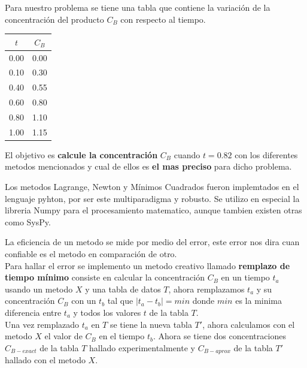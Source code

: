 \documentclass[10pt,a4paper]{article}
\begin{document}
\begin{multicols}{2}
		\noindent Para nuestro problema se tiene una tabla que contiene la variación de la concentración del producto $C_B$ con respecto al tiempo.
		
		\begin{center}
			\begin{tabular}{ |c|c| }
				\hline
				$t$ & $C_B$ \\ \hline
				0.00 & 0.00 \\ \hline
				0.10 & 0.30 \\ \hline
				0.40 & 0.55 \\ \hline
				0.60 & 0.80 \\ \hline
				0.80 & 1.10 \\ \hline
				1.00 & 1.15 \\ \hline
			\end{tabular}
		\end{center}
		
		\noindent El objetivo es \textbf{calcule la concentración} $C_B$ cuando $t = 0.82$ con los diferentes metodos mencionados y cual de ellos es \textbf{el mas preciso} para dicho problema.
				
		\noindent Los metodos Lagrange, Newton y Mínimos Cuadrados fueron implemtados en el lenguaje pyhton, por ser este multiparadigma y robusto. Se utilizo en especial la libreria Numpy para el procesamiento matematico, aunque tambien existen otras como SysPy. 
		
		\vspace*{0.2cm}
		
		\vspace*{0.2cm}
	
		\noindent La eficiencia de un metodo se mide por medio del error, este error nos dira cuan confiable es el metodo en comparación de otro.\\
		
		\noindent Para hallar el error se implemento un metodo creativo llamado \textbf{remplazo de tiempo mínimo} consiste en calcular la concentración $C_B$ en un tiempo $t_a$ usando un metodo $X$ y una tabla de datos $T$, ahora remplazamos $t_a$ y su concentración $C_B$ con un $t_b$ tal que $| t_a - t_b | = min$ donde $min$ es la minima diferencia entre $t_a$ y todos los valores $t$ de la tabla $T$.\\

		\noindent Una vez remplazado $t_a$ en $T$ se tiene la nueva tabla $T'$, ahora calculamos con el metodo $X$ el valor de $C_B$ en el tiempo $t_b$. Ahora se tiene dos concentraciones $C_{B-exact}$ de la tabla $T$ hallado experimentalmente y $C_{B-aprox}$ de la tabla $T'$ hallado con el metodo $X$.
	

\end{multicols}
\end{document}
